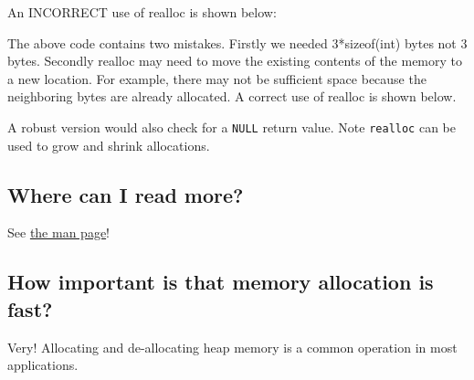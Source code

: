 An INCORRECT use of realloc is shown below:

\begin{Shaded}
\begin{Highlighting}[]
 \NormalTok{(}\NormalTok{) * }\NormalTok{);}
\NormalTok{array[}\NormalTok{] = }\NormalTok{; array[}\NormalTok{] = }\NormalTok{;}
\NormalTok{); }
\NormalTok{array[}\NormalTok{] = }\NormalTok{; }
\end{Highlighting}
\end{Shaded}

The above code contains two mistakes. Firstly we needed 3*sizeof(int)
bytes not 3 bytes. Secondly realloc may need to move the existing
contents of the memory to a new location. For example, there may not be
sufficient space because the neighboring bytes are already allocated. A
correct use of realloc is shown below.

\begin{Shaded}
\begin{Highlighting}[]
 \NormalTok{* }\NormalTok{(}\NormalTok{));}
\end{Highlighting}
\end{Shaded}

A robust version would also check for a \texttt{NULL} return value. Note
\texttt{realloc} can be used to grow and shrink allocations.

\subsection{Where can I read more?}\label{where-can-i-read-more}

See \href{http://man7.org/linux/man-pages/man3/malloc.3.html}{the man
page}!

\subsection{How important is that memory allocation is
fast?}\label{how-important-is-that-memory-allocation-is-fast}

Very! Allocating and de-allocating heap memory is a common operation in
most applications.

